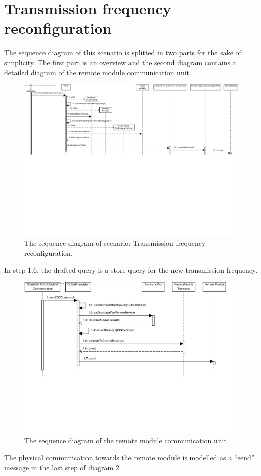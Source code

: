\section{Transmission frequency reconfiguration}

\npar The sequence diagram of this scenario is splitted in two parts for the
sake of simplicity. The first part is an overview and the second diagram
contains a detailed diagram of the remote module communication unit.

\begin{figure}[H]
	\begin{centering}
		\includegraphics[width=\textwidth]{figs/scenario-5-3-2.pdf}
		\caption{The sequence diagram of scenario: Transmission frequency reconfiguration.}
		\label{fig:scenario-5-3-2}
	\end{centering}
\end{figure}

\npar In step 1.6, the drafted query is a store query for the new transmission
frequency. 

\begin{figure}[H]
	\begin{centering}
		\includegraphics[width=\textwidth]{figs/scenario-5-3-2a.pdf}
		\caption{The sequence diagram of the remote module communication unit}
		\label{fig:scenario-5-3-2a}
	\end{centering}
\end{figure}

\npar The physical communication towards the remote module is modelled as a
``send'' message in the last step of diagram \ref{fig:scenario-5-3-2a}.
